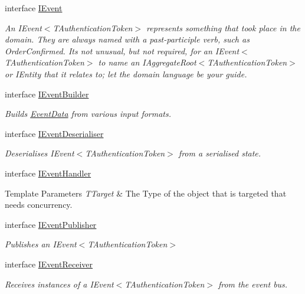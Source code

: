 \begin{DoxyCompactItemize}
interface \hyperlink{interfaceCqrs_1_1Events_1_1IEvent}{I\+Event}
\begin{DoxyCompactList}\small\item\em An I\+Event$<$\+T\+Authentication\+Token$>$ represents something that took place in the domain. They are always named with a past-\/participle verb, such as Order\+Confirmed. It\textquotesingle{}s not unusual, but not required, for an I\+Event$<$\+T\+Authentication\+Token$>$ to name an I\+Aggregate\+Root$<$\+T\+Authentication\+Token$>$ or I\+Entity that it relates to; let the domain language be your guide. \end{DoxyCompactList}\item 
interface \hyperlink{interfaceCqrs_1_1Events_1_1IEventBuilder}{I\+Event\+Builder}
\begin{DoxyCompactList}\small\item\em Builds \hyperlink{classCqrs_1_1Events_1_1EventData}{Event\+Data} from various input formats. \end{DoxyCompactList}\item 
interface \hyperlink{interfaceCqrs_1_1Events_1_1IEventDeserialiser}{I\+Event\+Deserialiser}
\begin{DoxyCompactList}\small\item\em Deserialises I\+Event$<$\+T\+Authentication\+Token$>$ from a serialised state. \end{DoxyCompactList}\item 
interface \hyperlink{interfaceCqrs_1_1Events_1_1IEventHandler}{I\+Event\+Handler}
\begin{DoxyCompactList}\small\item\em 
\begin{DoxyTemplParams}{Template Parameters}
{\em T\+Target} & The Type of the object that is targeted that needs concurrency.\\
\hline
\end{DoxyTemplParams}
\end{DoxyCompactList}\item 
interface \hyperlink{interfaceCqrs_1_1Events_1_1IEventPublisher}{I\+Event\+Publisher}
\begin{DoxyCompactList}\small\item\em Publishes an I\+Event$<$\+T\+Authentication\+Token$>$ \end{DoxyCompactList}\item 
interface \hyperlink{interfaceCqrs_1_1Events_1_1IEventReceiver}{I\+Event\+Receiver}
\begin{DoxyCompactList}\small\item\em Receives instances of a I\+Event$<$\+T\+Authentication\+Token$>$ from the event bus. \end{DoxyCompactList}\item 

\end{DoxyCompactItemize}
